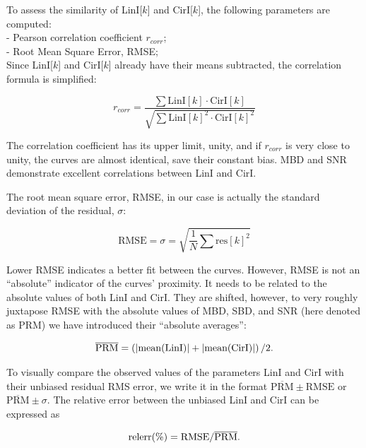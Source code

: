 \documentclass[letterpaper,twoside,12pt]{article}
\begin{document}
To assess the similarity of LinI[$k$] and CirI[$k$], the following parameters are computed: \\

\noindent - Pearson correlation coefficient $r_{corr}$; \\
\noindent - Root Mean Square Error, RMSE; \\

Since LinI[$k$] and CirI[$k$] already have their means subtracted, the correlation formula is simplified:

\begin{equation}
  \label{corr}
  r_{corr} = \frac{\sum \mathrm{LinI}[k] \cdot \mathrm{CirI}[k]}{\sqrt{\sum \mathrm{LinI}[k]^2 \cdot 
                   \mathrm{CirI}[k]^2}}
\end{equation}

The correlation coefficient has its upper limit, unity, and if $r_{corr}$ is very close to unity, the curves are almost identical, save their constant bias. MBD and SNR demonstrate excellent correlations between LinI and CirI.

The root mean square error, RMSE, in our case is actually the standard deviation of the residual, $\sigma$:

\begin{equation}
  \label{rmse}
  \mathrm{RMSE} = \sigma = \sqrt{\frac{1}{N} \sum \mathrm{res}[k]^2}
\end{equation}

Lower RMSE indicates a better fit between the curves. However, RMSE is not an ``absolute'' indicator of the curves' proximity. It needs to be related to the absolute values of both $\mathrm{LinI}$ and $\mathrm{CirI}$. They are shifted, however, to very roughly juxtapose RMSE with the absolute values of MBD, SBD, and SNR (here denoted as PRM) we have introduced their ``absolute averages'':

\begin{equation}
  \label{abs_avg}
  \overline{\mathrm{PRM}} = \left( \rm |mean(LinI)| + |mean(CirI)| \right)/2.
\end{equation}

To visually compare the observed values of the parameters LinI and CirI with their unbiased residual RMS error, we write it in the format $\overline{\mathrm{PRM}} \pm \mathrm{RMSE}$ or $\overline{\mathrm{PRM}} \pm \sigma$. The relative error between the unbiased LinI and CirI can be expressed as

\begin{equation}
  \label{rel_err}
  \rm relerr (\%) = RMSE / \overline{\mathrm{PRM}}.
\end{equation}
 
\end{document}
